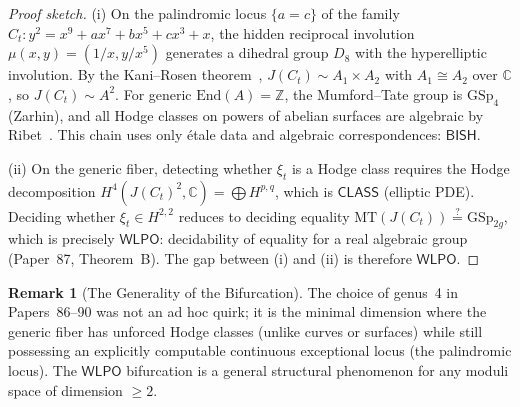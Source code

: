 \documentclass[11pt,a4paper]{article}
\theoremstyle{plain}
\theoremstyle{definition}
\newtheorem{remark}[theorem]{Remark}
\newcommand{\BISH}{\textsf{BISH}}
\newcommand{\WLPO}{\textsf{WLPO}}
\newcommand{\CLASS}{\textsf{CLASS}}
\newcommand{\Z}{\mathbb{Z}}
\newcommand{\C}{\mathbb{C}}
\begin{document}
\begin{proof}[Proof sketch]
(i) On the palindromic locus $\{a = c\}$ of the family $C_t : y^2 = x^9 + ax^7 + bx^5 + cx^3 + x$, the hidden reciprocal involution $\mu(x,y) = (1/x, y/x^5)$ generates a dihedral group $D_8$ with the hyperelliptic involution. By the Kani--Rosen theorem~\cite{kani-rosen89}, $J(C_t) \sim A_1 \times A_2$ with $A_1 \cong A_2$ over $\C$, so $J(C_t) \sim A^2$. For generic $\mathrm{End}(A) = \Z$, the Mumford--Tate group is $\mathrm{GSp}_4$ (Zarhin), and all Hodge classes on powers of abelian surfaces are algebraic by Ribet~\cite{ribet83}. This chain uses only \'etale data and algebraic correspondences: $\BISH$.

(ii) On the generic fiber, detecting whether $\xi_t$ is a Hodge class requires the Hodge decomposition $H^4(J(C_t)^2, \C) = \bigoplus H^{p,q}$, which is $\CLASS$ (elliptic PDE). Deciding whether $\xi_t \in H^{2,2}$ reduces to deciding equality $\mathrm{MT}(J(C_t)) \stackrel{?}{=} \mathrm{GSp}_{2g}$, which is precisely $\WLPO$: decidability of equality for a real algebraic group (Paper~87, Theorem~B). The gap between (i) and (ii) is therefore $\WLPO$.
\end{proof}

\begin{remark}[The Generality of the Bifurcation]\label{rem:hodge_genus}
The choice of genus~4 in Papers~86--90 was not an ad hoc quirk; it is the minimal dimension where the generic fiber has unforced Hodge classes (unlike curves or surfaces) while still possessing an explicitly computable continuous exceptional locus (the palindromic locus). The $\WLPO$ bifurcation is a general structural phenomenon for any moduli space of dimension $\geq 2$.
\end{remark}
\end{document}
